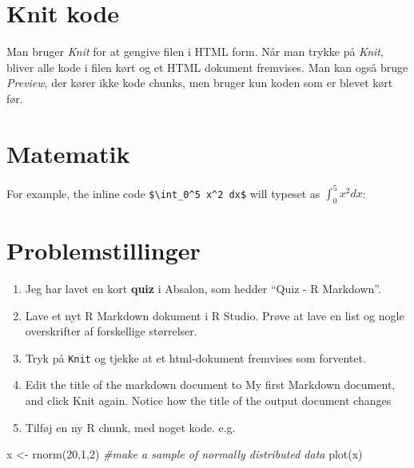 \documentclass[
]{book}
\newenvironment{Shaded}{\begin{snugshade}}{\end{snugshade}}
\newcommand{\CommentTok}[1]{\textcolor[rgb]{0.56,0.35,0.01}{\textit{#1}}}
\newcommand{\DecValTok}[1]{\textcolor[rgb]{0.00,0.00,0.81}{#1}}
\newcommand{\FunctionTok}[1]{\textcolor[rgb]{0.00,0.00,0.00}{#1}}
\newcommand{\NormalTok}[1]{#1}
\newcommand{\OtherTok}[1]{\textcolor[rgb]{0.56,0.35,0.01}{#1}}
\begin{document}
\hypertarget{knit-kode}{%
\section{Knit kode}\label{knit-kode}}

Man bruger \emph{Knit} for at gengive filen i HTML form. Når man trykke på \emph{Knit}, bliver alle kode i filen kørt og et HTML dokument fremvises. Man kan også bruge \emph{Preview}, der kører ikke kode chunks, men bruger kun koden som er blevet kørt før.

\hypertarget{matematik}{%
\section{Matematik}\label{matematik}}

For example, the inline code \texttt{\$\textbackslash{}int\_0\^{}5\ x\^{}2\ dx\$} will typeset as \(\int_0^5 x^2 dx\):

\hypertarget{problemstillinger-1}{%
\section{Problemstillinger}\label{problemstillinger-1}}

\begin{enumerate}
\def\labelenumi{\arabic{enumi})}
\item
  Jeg har lavet en kort \textbf{quiz} i Absalon, som hedder ``Quiz - R Markdown''.
\item
  Lave et nyt R Markdown dokument i R Studio. Prøve at lave en list og nogle overskrifter af forskellige størrelser.
\item
  Tryk på \texttt{Knit} og tjekke at et html-dokument fremvises som forventet.
\item
  Edit the title of the markdown document to My first Markdown document, and click Knit again. Notice
  how the title of the output document changes
\item
  Tilføj en ny R chunk, med noget kode. e.g.
\end{enumerate}

\begin{Shaded}
\begin{Highlighting}[]
\NormalTok{x }\OtherTok{\textless{}{-}} \FunctionTok{rnorm}\NormalTok{(}\DecValTok{20}\NormalTok{,}\DecValTok{1}\NormalTok{,}\DecValTok{2}\NormalTok{) }\CommentTok{\#make a sample of normally distributed data}
\FunctionTok{plot}\NormalTok{(x)}
\end{Highlighting}
\end{Shaded}
\end{document}
